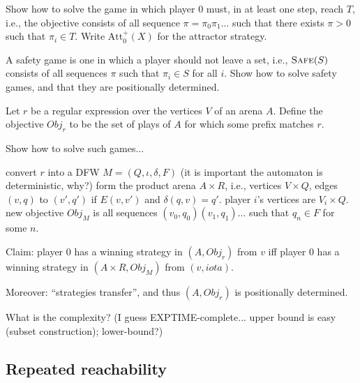 \documentclass[a4paper,10pt]{article}
\newcommand{\safe}[1]{\textsc{Safe}(#1)}
\newcommand{\att}{\textrm{Att}}
\begin{document}



\begin{question}
Show how to solve the game in which player $0$ must, in at least one step, reach $T$, i.e., the objective consists of all sequence $\pi = \pi_0 \pi_1 \dots$ 
such that there exists $\pi > 0$ such that $\pi_i \in T$. Write $\att^+_0(X)$ for the attractor strategy.
\end{question}


\begin{question}
A safety game is one in which a player should not leave a set, i.e., $\safe{S}$ consists of all sequences $\pi$ such that $\pi_i \in S$ for all $i$. 
Show how to solve safety games, and that they are positionally determined. 
\end{question}




\begin{question}
Let $r$ be a regular expression over the vertices $V$ of an arena $A$. Define the objective $Obj_r$ to be 
the set of plays of $A$ for which some prefix matches $r$.

Show how to solve such games...

\en
\- convert $r$ into a DFW $M = (Q,\iota,\delta,F)$ (it is important the automaton is deterministic, why?)
\- form the product arena $A\times R$, i.e., vertices $V \times Q$, edges $(v,q)$ to $(v',q')$ if $E(v,v')$ and $\delta(q,v) = q'$.
\- player $i$'s vertices are $V_i \times Q$.
\- new objective $Obj_M$ is all sequences $(v_0,q_0) (v_1,q_1) ...$ such that $q_n \in F$ for some $n$.
\ne

Claim: player $0$ has a winning strategy in $(A,Obj_r)$ from $v$ iff player $0$ has a winning strategy in $(A \times R, Obj_M)$ from $(v,iota)$.

Moreover: ``strategies transfer'', and thus $(A,Obj_r)$ is positionally determined.

What is the complexity? (I guess EXPTIME-complete... upper bound is easy (subset construction); lower-bound?)


\end{question}

\subsection{Repeated reachability}
\end{document}
